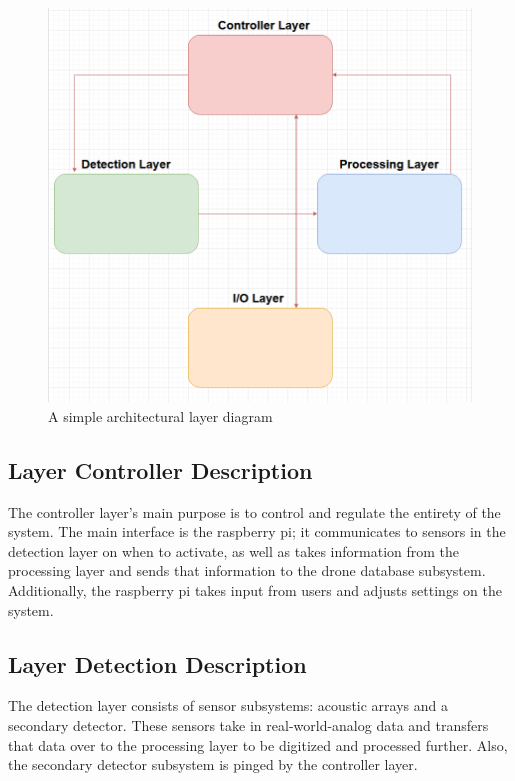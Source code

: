 \begin{figure}[h!]
	\centering
 	\includegraphics[width=1\textwidth]{images/adslayoutclean.png}
 \caption{A simple architectural layer diagram}
\end{figure}

\subsection{Layer Controller Description}
The controller layer's main purpose is to control and regulate the entirety of the system.  The main interface is the raspberry pi; it communicates to sensors in the detection layer on when to activate, as well as takes information from the processing layer and sends that information to the drone database subsystem.  Additionally, the raspberry pi takes input from users and adjusts settings on the system.

\subsection{Layer Detection Description}
The detection layer consists of sensor subsystems:  acoustic arrays and a secondary detector.  These sensors take in real-world-analog data and transfers that data over to the processing layer to be digitized and processed further.  Also, the secondary detector subsystem is pinged by the controller layer.

